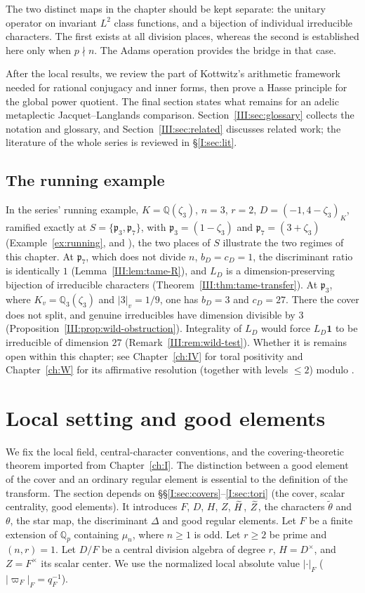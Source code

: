 The two distinct maps in the chapter should be kept separate:
the unitary operator on invariant $L^2$ class functions, and a
bijection of individual irreducible characters. The first exists at
all division places, whereas the second is established here only
when $p\nmid n$. The Adams operation provides the bridge in that case.

After the local results, we review the part of Kottwitz's arithmetic
framework needed for rational conjugacy and inner forms, then prove
a Hasse principle for the global power quotient. The final section
states what remains for an adelic metaplectic Jacquet--Langlands
comparison. Section~\ref{III:sec:glossary} collects the notation and glossary, and Section~\ref{III:sec:related} discusses related work; the literature of the whole series is reviewed in \S\ref{I:sec:lit}.

\subsection*{The running example}
In the series' running example, $K=\mathbb{Q}(\zeta_3)$, $n=3$, $r=2$, $D=(-1,4-\zeta_3)_K$, ramified exactly at $S=\{\mathfrak p_3,\mathfrak p_7\}$, with $\mathfrak p_3=(1-\zeta_3)$ and $\mathfrak p_7=(3+\zeta_3)$ (Example~\ref{ex:running}, and \cite{JC26b}), the two places of $S$ illustrate the two regimes of this chapter. At $\mathfrak p_7$, which does not divide $n$, $b_D=c_D=1$, the discriminant ratio is identically $1$ (Lemma~\ref{III:lem:tame-R}), and $L_D$ is a dimension-preserving bijection of irreducible characters (Theorem~\ref{III:thm:tame-transfer}). At $\mathfrak p_3$, where $K_v=\mathbb{Q}_3(\zeta_3)$ and $|3|_v=1/9$, one has $b_D=3$ and $c_D=27$. There the cover does not split, and genuine irreducibles have dimension divisible by $3$ (Proposition~\ref{III:prop:wild-obstruction}). Integrality of $L_D$ would force $L_D\mathbf 1$ to be irreducible of dimension $27$ (Remark~\ref{III:rem:wild-test}). Whether it is remains open within this chapter; see Chapter~\ref{ch:IV} for toral positivity and Chapter~\ref{ch:W} for its affirmative resolution (together with levels $\le2$) modulo \Pctag.

\section{Local setting and good elements}\label{III:sec:setting}
We fix the local field, central-character conventions, and the
covering-theoretic theorem imported from Chapter~\ref{ch:I}. The distinction
between a good element of the cover and an ordinary regular element
is essential to the definition of the transform. The section depends on \S\S\ref{I:sec:covers}--\ref{I:sec:tori} (the cover, scalar centrality, good elements). It introduces $F$, $D$, $H$, $Z$, $\widetilde H$, $\widetilde Z$, the characters $\tilde\theta$ and $\theta$, the star map, the discriminant $\Delta$ and good regular elements.
Let $F$ be a finite extension of $\mathbb Q_p$ containing $\mu_n$, where $n\ge1$ is odd. Let $r\ge2$ be prime and $(n,r)=1$. Let $D/F$ be a central division algebra of degree $r$, $H=D^\times$, and $Z=F^\times$ its scalar center. We use the normalized local absolute value $|\cdot|_F$ ($|\varpi_F|_F=q_F^{-1}$).

